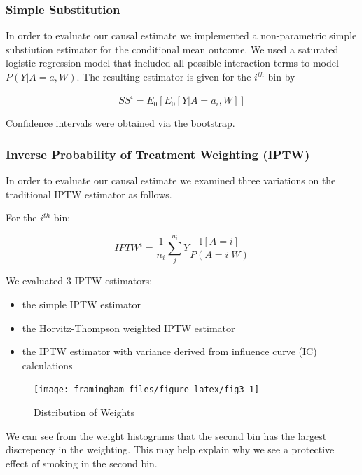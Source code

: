 \documentclass[]{article}
\begin{document}
\hypertarget{simple-substitution}{%
\subsubsection{Simple Substitution}\label{simple-substitution}}

In order to evaluate our causal estimate we implemented a non-parametric
simple substiution estimator for the conditional mean outcome. We used a
saturated logistic regression model that included all possible
interaction terms to model \(P(Y | A=a ,W)\). The resulting estimator is
given for the \(i^{th}\) bin by

\[ SS^{i} = E_0[E_0[Y|A=a_i,W]]\]

Confidence intervals were obtained via the bootstrap.

\hypertarget{inverse-probability-of-treatment-weighting-iptw}{%
\subsubsection{Inverse Probability of Treatment Weighting
(IPTW)}\label{inverse-probability-of-treatment-weighting-iptw}}

In order to evaluate our causal estimate we examined three variations on
the traditional IPTW estimator as follows.

For the \(i^{th}\) bin:

\[IPTW^i = \frac{1}{n_i} \sum_{j}^{n_i} Y\frac{ \mathbb{I} [A = i]}{P(A = i | W)}\]

We evaluated 3 IPTW estimators:

\begin{itemize}
\item the simple IPTW estimator
\item the Horvitz-Thompson weighted IPTW estimator 
\item the IPTW estimator with variance derived from influence curve (IC) calculations
\end{itemize}

\begin{figure}[H]

{\centering \texttt{[image: framingham\_files/figure-latex/fig3-1]} 

}

\caption{Distribution of Weights}\label{fig:fig3}
\end{figure}

We can see from the weight histograms that the second bin has the
largest discrepency in the weighting. This may help explain why we see a
protective effect of smoking in the second bin.
\end{document}
